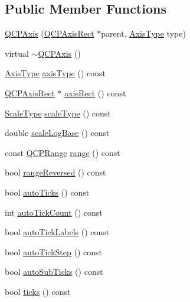 \subsection*{Public Member Functions}
\begin{DoxyCompactItemize}
\item 
\hyperlink{class_q_c_p_axis_ac62c042968bae0e6d474fcfc57c9b71f}{Q\+C\+P\+Axis} (\hyperlink{class_q_c_p_axis_rect}{Q\+C\+P\+Axis\+Rect} $\ast$parent, \hyperlink{class_q_c_p_axis_ae2bcc1728b382f10f064612b368bc18a}{Axis\+Type} type)
\item 
virtual \hyperlink{class_q_c_p_axis_a7cfa27ea9da0bb1fe0ae995572c0b85d}{$\sim$\+Q\+C\+P\+Axis} ()
\item 
\hyperlink{class_q_c_p_axis_ae2bcc1728b382f10f064612b368bc18a}{Axis\+Type} \hyperlink{class_q_c_p_axis_a593c37bf6aa4990326dc09e24f45db7f}{axis\+Type} () const 
\item 
\hyperlink{class_q_c_p_axis_rect}{Q\+C\+P\+Axis\+Rect} $\ast$ \hyperlink{class_q_c_p_axis_aada3102af43b029e3879bcbf2bddfabb}{axis\+Rect} () const 
\item 
\hyperlink{class_q_c_p_axis_a36d8e8658dbaa179bf2aeb973db2d6f0}{Scale\+Type} \hyperlink{class_q_c_p_axis_a8563e13407bc0616da7f7c84e02de170}{scale\+Type} () const 
\item 
double \hyperlink{class_q_c_p_axis_ac937d2a602f865aff2ab6c1e288739f6}{scale\+Log\+Base} () const 
\item 
const \hyperlink{class_q_c_p_range}{Q\+C\+P\+Range} \hyperlink{class_q_c_p_axis_ab1ea79a4f5ea4cf42620f8f51c477ac4}{range} () const 
\item 
bool \hyperlink{class_q_c_p_axis_ade26dc7994ccd8a11f64fd83377ee021}{range\+Reversed} () const 
\item 
bool \hyperlink{class_q_c_p_axis_afc7f20e30dc2865ff6c39f3281f330c2}{auto\+Ticks} () const 
\item 
int \hyperlink{class_q_c_p_axis_ac87454a1342f5d2939ab59e68b4d515b}{auto\+Tick\+Count} () const 
\item 
bool \hyperlink{class_q_c_p_axis_a7169da316ac25dec1606784152fbf2c1}{auto\+Tick\+Labels} () const 
\item 
bool \hyperlink{class_q_c_p_axis_ae762920261b0c24beb56b893e5a2471d}{auto\+Tick\+Step} () const 
\item 
bool \hyperlink{class_q_c_p_axis_ab9a950e16f373fe5c4b79078bb97c171}{auto\+Sub\+Ticks} () const 
\item 
bool \hyperlink{class_q_c_p_axis_a61c504ec7c5bed9a63edf45345995d10}{ticks} () const 

\end{DoxyCompactItemize}

